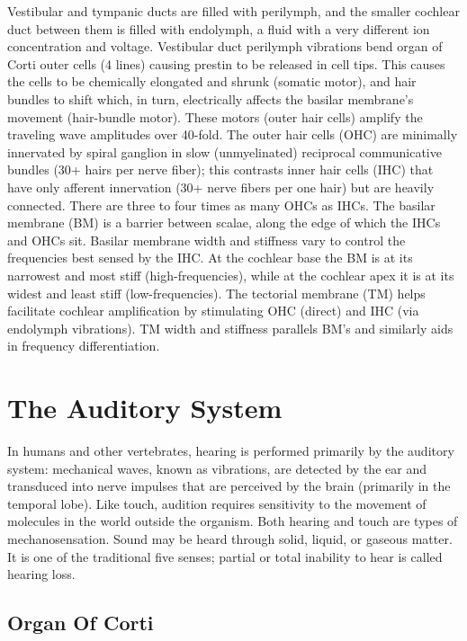 Vestibular and tympanic ducts are filled with perilymph, and the smaller cochlear duct between them is filled with endolymph, a fluid with a very different ion concentration and voltage. Vestibular duct perilymph vibrations bend organ of Corti outer cells (4 lines) causing prestin to be released in cell tips. This causes the cells to be chemically elongated and shrunk (somatic motor), and hair bundles to shift which, in turn, electrically affects the basilar membrane's movement (hair-bundle motor). These motors (outer hair cells) amplify the traveling wave amplitudes over 40-fold. The outer hair cells (OHC) are minimally innervated by spiral ganglion in slow (unmyelinated) reciprocal communicative bundles (30+ hairs per nerve fiber); this contrasts inner hair cells (IHC) that have only afferent innervation (30+ nerve fibers per one hair) but are heavily connected. There are three to four times as many OHCs as IHCs. The basilar membrane (BM) is a barrier between scalae, along the edge of which the IHCs and OHCs sit. Basilar membrane width and stiffness vary to control the frequencies best sensed by the IHC. At the cochlear base the BM is at its narrowest and most stiff (high-frequencies), while at the cochlear apex it is at its widest and least stiff (low-frequencies). The tectorial membrane (TM) helps facilitate cochlear amplification by stimulating OHC (direct) and IHC (via endolymph vibrations). TM width and stiffness parallels BM's and similarly aids in frequency differentiation.

\hypertarget{the-auditory-system}{%
\section{The Auditory System}\label{the-auditory-system}}

In humans and other vertebrates, hearing is performed primarily by the auditory system: mechanical waves, known as vibrations, are detected by the ear and transduced into nerve impulses that are perceived by the brain (primarily in the temporal lobe). Like touch, audition requires sensitivity to the movement of molecules in the world outside the organism. Both hearing and touch are types of mechanosensation. Sound may be heard through solid, liquid, or gaseous matter. It is one of the traditional five senses; partial or total inability to hear is called hearing loss.

\hypertarget{organ-of-corti}{%
\subsection{Organ Of Corti}\label{organ-of-corti}}

